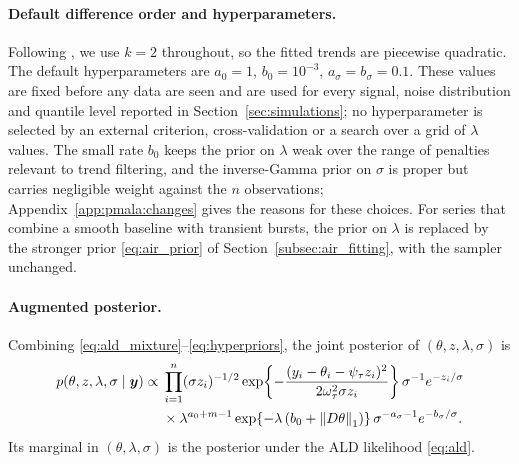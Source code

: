 \paragraph{Default difference order and hyperparameters.} Following \citet{brantley2020baseline}, we use $k = 2$ throughout, so the fitted trends are piecewise quadratic. The default hyperparameters are $a_0 = 1$, $b_0 = 10^{-3}$, $a_\sigma = b_\sigma = 0.1$. These values are fixed before any data are seen and are used for every signal, noise distribution and quantile level reported in Section~\ref{sec:simulations}; no hyperparameter is selected by an external criterion, cross-validation or a search over a grid of $\lambda$ values. The small rate $b_0$ keeps the prior on $\lambda$ weak over the range of penalties relevant to trend filtering, and the inverse-Gamma prior on $\sigma$ is proper but carries negligible weight against the $n$ observations; Appendix~\ref{app:pmala:changes} gives the reasons for these choices. For series that combine a smooth baseline with transient bursts, the prior on $\lambda$ is replaced by the stronger prior \eqref{eq:air_prior} of Section~\ref{subsec:air_fitting}, with the sampler unchanged.

\paragraph{Augmented posterior.} Combining \eqref{eq:ald_mixture}--\eqref{eq:hyperpriors}, the joint posterior of $(\theta, z, \lambda, \sigma)$ is
\begin{equation}
\begin{aligned}
    p(\theta, z, \lambda, \sigma \mid \bm{y}) \propto{} & \prod_{i=1}^n (\sigma z_i)^{-1/2} \exp\!\left\{-\frac{(y_i-\theta_i-\psi_\tau z_i)^2}{2\omega_\tau^2 \sigma z_i}\right\} \sigma^{-1} e^{-z_i/\sigma} \\
    & \times \lambda^{a_0 + m - 1} \exp\!\left\{-\lambda\left(b_0 + \left\lVert D\theta\right\rVert_1\right)\right\} \sigma^{-a_\sigma - 1} e^{-b_\sigma/\sigma}.
\end{aligned}
    \label{eq:posterior}
\end{equation}
Its marginal in $(\theta, \lambda, \sigma)$ is the posterior under the ALD likelihood \eqref{eq:ald}.

